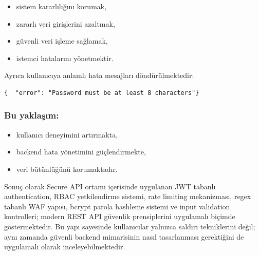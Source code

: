 \begin{itemize}[leftmargin=*]
    \item sistem kararlılığını korumak,
    \item zararlı veri girişlerini azaltmak,
    \item güvenli veri işleme sağlamak,
    \item istemci hatalarını yönetmektir.
\end{itemize}

Ayrıca kullanıcıya anlamlı hata mesajları döndürülmektedir:

\begin{lstlisting}
{  "error": "Password must be at least 8 characters"}
\end{lstlisting}

\subsubsection{Bu yaklaşım:}

\begin{itemize}[leftmargin=*]
    \item kullanıcı deneyimini artırmakta,
    \item backend hata yönetimini güçlendirmekte,
    \item veri bütünlüğünü korumaktadır.
\end{itemize}

Sonuç olarak Secure API ortamı içerisinde uygulanan JWT tabanlı authentication, RBAC yetkilendirme sistemi, rate limiting mekanizması, regex tabanlı WAF yapısı, bcrypt parola hashleme sistemi ve input validation kontrolleri; modern REST API güvenlik prensiplerini uygulamalı biçimde göstermektedir. Bu yapı sayesinde kullanıcılar yalnızca saldırı tekniklerini değil; aynı zamanda güvenli backend mimarisinin nasıl tasarlanması gerektiğini de uygulamalı olarak inceleyebilmektedir.


\clearpage
